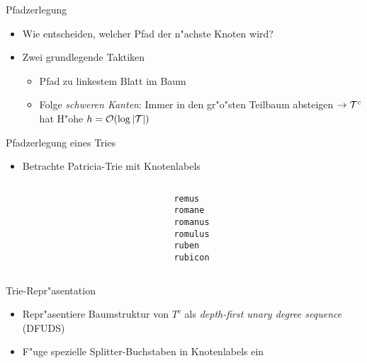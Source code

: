 \documentclass[ngerman,hyperref={pdfpagelabels=true}]{beamer}
\begin{document}
\begin{frame}{Pfadzerlegung}
\begin{itemize}
\item Wie entscheiden, welcher Pfad der n"achste Knoten wird?
\item Zwei grundlegende Taktiken
\begin{itemize}
\item Pfad zu linkestem Blatt im Baum
\item Folge \emph{schweren Kanten}: Immer in den gr"o"sten Teilbaum absteigen
$\rightarrow \mathcal{T}^c$ hat H"ohe $h = \mathcal{O}(\log |\mathcal{T}|)$
\end{itemize}
\end{itemize}
\end{frame}

\newcommand{\edgelabel}[2]{edge from parent node[draw=none,#1]{\lstinline|#2|}}

\begin{frame}{Pfadzerlegung eines Tries}
\begin{itemize}
\item Betrachte Patricia-Trie mit Knotenlabels
\end{itemize}

\begin{columns}[T] %
\begin{column}{.48\textwidth}

\centering


\end{column}%
\hfill%
\begin{column}{.48\textwidth}



\lstinline|remus| \\
\lstinline|romane| \\
\lstinline|romanus| \\
\lstinline|romulus| \\
\lstinline|ruben| \\
\lstinline|rubicon| \\

\end{column}
\end{columns}

\end{frame}

\begin{frame}{Trie-Repr"asentation}

\begin{itemize}

\item Repr"asentiere Baumstruktur von $T^c$ als \emph{depth-first unary degree sequence} (DFUDS)
\item F"uge spezielle Splitter-Buchstaben in Knotenlabels ein
\end{itemize}

\centering



\end{frame}
\end{document}
